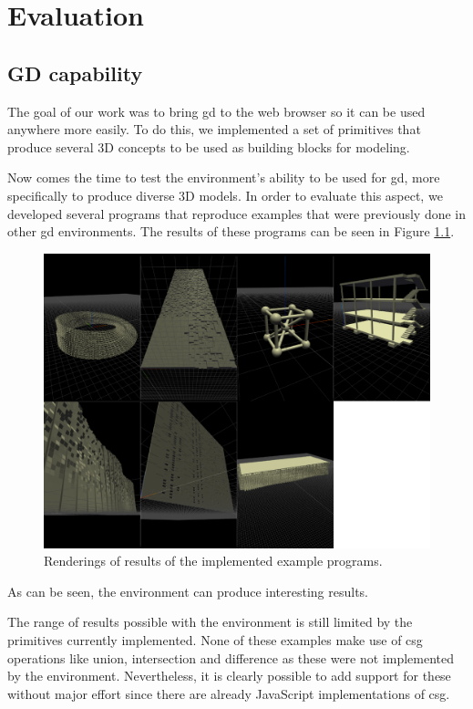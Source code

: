 
\chapter{Evaluation}
\label{chapter:evaluation}




\section{GD capability}
The goal of our work was to bring \gls{gd} to the web browser so it can be used anywhere more easily.
To do this, we implemented a set of primitives that produce several 3D concepts to be used as building blocks for modeling.

Now comes the time to test the environment's ability to be used for \gls{gd}, more specifically to produce diverse 3D models.
In order to evaluate this aspect, we developed several programs that reproduce examples that were previously done in other \gls{gd} environments.
The results of these programs can be seen in Figure \ref{fig:all:examples}.

\begin{figure}
  \centering
  \includegraphics[width=12cm]{./images/all_examples}
  \caption{Renderings of results of the implemented example programs.}
  \label{fig:all:examples}
\end{figure}

As can be seen, the environment can produce interesting results.

The range of results possible with the environment is still limited by the primitives currently implemented.
None of these examples make use of \gls{csg} operations like union, intersection and difference as these were not implemented by the environment.
Nevertheless, it is clearly possible to add support for these without major effort since there are already JavaScript implementations of \gls{csg}.


